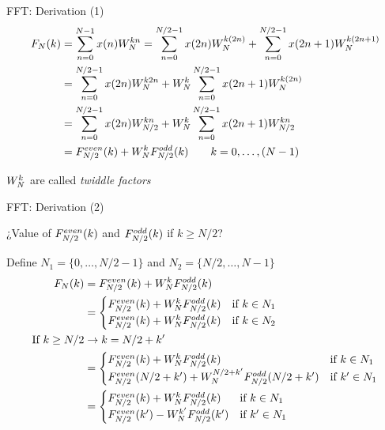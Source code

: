 
\begin{myframe}{FFT: Derivation (1) }
\centering
\begin{align*}
F_N (k)&= \sum_{n=0}^{N-1} x(n) W_N^{kn} = \sum_{n=0}^{N/2-1} x(2n) W_N^{k (2n)} + \sum_{n=0}^{N/2-1} x(2n+1) W_N^{k (2n+1)} \\
&= \sum_{n=0}^{N/2-1} x(2n) W_N^{k 2 n} + W_N^{k} \sum_{n=0}^{N/2-1} x(2n+1) W_N^{k(2n)} \\
&= \sum_{n=0}^{N/2-1} x(2n) W_{N/2}^{kn} + W_N^{k} \sum_{n=0}^{N/2-1} x(2n+1) W_{N/2}^{kn} \\
&= F_{N/2}^{even} (k) + W_N^{k} F_{N/2}^{odd} (k) \qquad k=0,\dots,(N-1)
\end{align*}

\begin{block}{}
\centering
$W_N^{k}$ are called \textit{twiddle factors}
\end{block}

\end{myframe}

\begin{myframe}{FFT: Derivation (2)}
\centering

\begin{block}{}
\centering
¿Value of $F_{N/2}^{even}(k)$ and $F_{N/2}^{odd}(k)$ if $k \geq N/2$?
\end{block}

Define $N_1=\{ 0,\dots,N/2-1 \}$ and $N_2=\{ N/2,\dots,N-1 \}$
\begin{align*}
F_N (k)&= F_{N/2}^{even} (k) + W_N^{k} F_{N/2}^{odd} (k)\\
&= \begin{cases}
F_{N/2}^{even} (k) + W_N^{k} F_{N/2}^{odd} (k) &\mbox{if } k \in N_1 \\
F_{N/2}^{even} (k) + W_N^{k} F_{N/2}^{odd} (k) & \mbox{if } k \in N_2 \\
\end{cases}
\\  \text{If } k\geq N/2 &\rightarrow k=N/2+k'
\\ &= \begin{cases}
F_{N/2}^{even} (k) + W_N^{k} F_{N/2}^{odd} (k) &\mbox{if } k \in N_1 \\
F_{N/2}^{even} (N/2+k') + W_N^{N/2+k'} F_{N/2}^{odd} (N/2+k') & \mbox{if } k' \in N_1
\end{cases}
\\ &= \begin{cases}
F_{N/2}^{even} (k) + W_N^{k} F_{N/2}^{odd} (k) & \mbox{if } k \in N_1 \\
F_{N/2}^{even} (k') - W_N^{k'} F_{N/2}^{odd} (k') & \mbox{if } k' \in N_1
\end{cases}
\end{align*}

\end{myframe}

